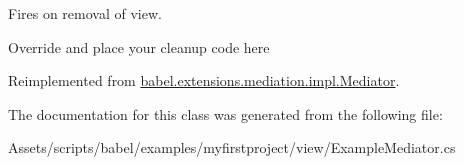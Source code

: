 Fires on removal of view. 

Override and place your cleanup code here 

Reimplemented from \hyperlink{classbabel_1_1extensions_1_1mediation_1_1impl_1_1_mediator_a8b818665eda883eac66c83b8468007e9}{babel.\-extensions.\-mediation.\-impl.\-Mediator}.



The documentation for this class was generated from the following file\-:\begin{DoxyCompactItemize}
\item 
Assets/scripts/babel/examples/myfirstproject/view/Example\-Mediator.\-cs\end{DoxyCompactItemize}
